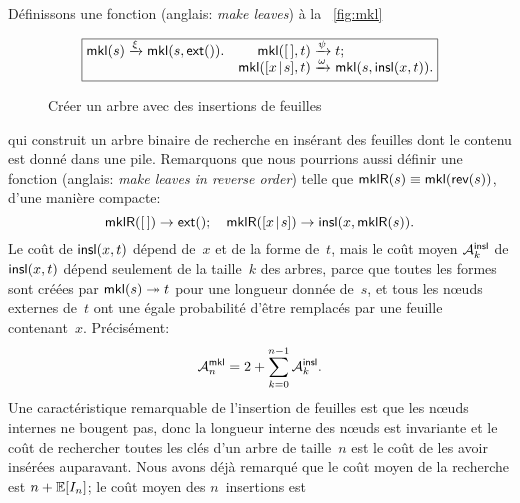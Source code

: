\noindent Définissons une fonction 
 (anglais: \emph{make leaves}) à la
\fig~\vref{fig:mkl}
\begin{figure}
\begin{equation*}
\boxed{
\begin{array}{@{}r@{\;}l@{\;}lr@{\;}l@{\;}l@{}}
  \fun{mkl}(s) & \xrightarrow{\smash{\xi}} & \fun{mkl}(s,\fun{ext}()).
& \fun{mkl}(\el,t) & \xrightarrow{\smash{\psi}} & t;\\
& & & \fun{mkl}(\cons{x}{s},t) & \xrightarrow{\smash{\omega}} & \fun{mkl}(s,\fun{insl}(x,t)).
\end{array}}
\end{equation*}
\caption{Créer un arbre avec des insertions de feuilles}
\label{fig:mkl}
\end{figure}
qui construit un arbre binaire de recherche en insérant des feuilles
dont le contenu est donné dans une pile. Remarquons que nous pourrions
aussi définir une fonction 
(anglais: \emph{make leaves in reverse order}) telle que
\(\fun{mklR}(s) \equiv \fun{mkl}(\fun{rev}(s))\), d'une manière
compacte:
\begin{equation}
  \fun{mklR}(\el) \rightarrow \fun{ext}();
  \quad
  \fun{mklR}(\cons{x}{s}) \rightarrow \fun{insl}(x,\fun{mklR}(s)).
\label{eq:mklR}
\end{equation}
Le coût de \(\fun{insl}(x,t)\) dépend de~\(x\) et de la forme
de~\(t\), mais le coût moyen
\(\M{\fun{insl}}{k}\) de
\(\fun{insl}(x,t)\) dépend seulement de la taille~\(k\) des arbres,
parce que toutes les formes sont créées par \(\fun{mkl}(s)
\twoheadrightarrow t\) pour une longueur donnée de~\(s\), et tous les
nœuds externes de~\(t\) ont une égale probabilité d'être remplacés
par une feuille contenant~\(x\). Précisément:
\begin{equation}
\abovedisplayskip=2pt
\abovedisplayshortskip=2pt
\belowdisplayskip=4pt
\M{\fun{mkl}}{n} = 2 + \sum_{k=0}^{n-1}\M{\fun{insl}}{k}.
\label{eq:Mmkl0}
\end{equation}
Une caractéristique remarquable de l'insertion de feuilles est que les
nœuds internes ne bougent pas, donc la longueur
interne des
nœuds est invariante et le coût de rechercher toutes les clés d'un
arbre de taille~\(n\) est le coût de les avoir insérées
auparavant. Nous avons déjà remarqué que le coût moyen de la recherche
est \(n + \Expected{I_n}\); le coût moyen des \(n\)~insertions est
